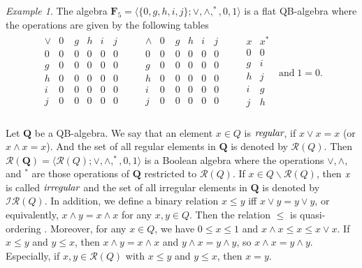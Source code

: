 \documentclass[12pt]{amsart}
\theoremstyle{definition}
\theoremstyle{remark}
\newtheorem{example}{Example}[section]
\numberwithin{equation}{section}
\begin{document}
\begin{example}\label{Example F5}
The algebra $\mathbf{F}_{5} = \langle \{0,g,h,i,j\} ; \vee ,\wedge ,^\ast, 0, 1 \rangle$ is a flat QB-algebra where the operations are given by the  following tables\\
\begin{eqnarray*}
\begin{array}{c|ccccccccc} \vee & 0\; & g& h& i& j \\ \hline 0 & 0 & 0& 0 &0 & 0 \\ g & 0 & 0& 0 & 0& 0 \\ h & 0 & 0& 0 &0 &0  \\ i & 0 & 0& 0 & 0& 0 \\ j & 0 & 0& 0 & 0& 0 \\
\end{array}\qquad
\begin{array}{c|ccccccccc} \wedge & 0\; & g& h& i& j \\ \hline 0 & 0 & 0& 0 &0 & 0 \\ g & 0 & 0& 0 & 0& 0 \\ h & 0 & 0& 0 &0 &0  \\ i & 0 & 0& 0 & 0& 0 \\ j & 0 & 0& 0 & 0& 0 \\
\end{array}\qquad
\begin{array}{c|ccccccccc} x & x^{*}   \\ \hline 0 & 0 \\ g & i\\ h & j \\i & g \\j & h \\  \end{array} \;\;\mathrm{and}\; 1=0.
\end{eqnarray*}
\end{example}

Let $\mathbf{Q}$ be a QB-algebra. We say that an element $x\in Q$ is $\emph{regular}$, if $x\vee x=x$ (or $x\wedge x=x$). And the set of all regular elements in $\mathbf{Q}$ is denoted by $\mathscr{R}(Q)$. Then $\mathscr{R}(\mathbf{Q})=\langle \mathscr{R}(Q); \vee ,\wedge ,^\ast, 0, 1 \rangle$ is a Boolean algebra where the operations $\vee,\wedge$, and $^\ast$ are those operations of $\mathbf{Q}$ restricted to $\mathscr{R}(Q)$. If $x\in Q\backslash\mathscr{R}(Q)$, then $\emph{x}$ is called $\emph{irregular}$ and the set of all irregular elements in $\mathbf{Q}$ is denoted by $\mathscr{IR}(Q)$. In addition, we define a binary relation $x\leq y$ iff $x \vee y=y\vee y$, or equivalently, $x \wedge y = x \wedge x$ for any $x,y\in Q$. Then the relation $\leq$ is quasi-ordering \cite{Engineering}. Moreover, for any $x\in Q$, we have $0\leq x\leq 1$ and $x\wedge x \leq x \leq x \vee x$. If $x\leq y$ and $y\leq x$, then $x\wedge y=x\wedge x$ and $y\wedge x=y\wedge y$, so $x\wedge x=y\wedge y$. Especially, if $x,y\in \mathscr{R}(Q)$ with $x\leq y$ and $y\leq x$, then $x=y$.
\end{document}
